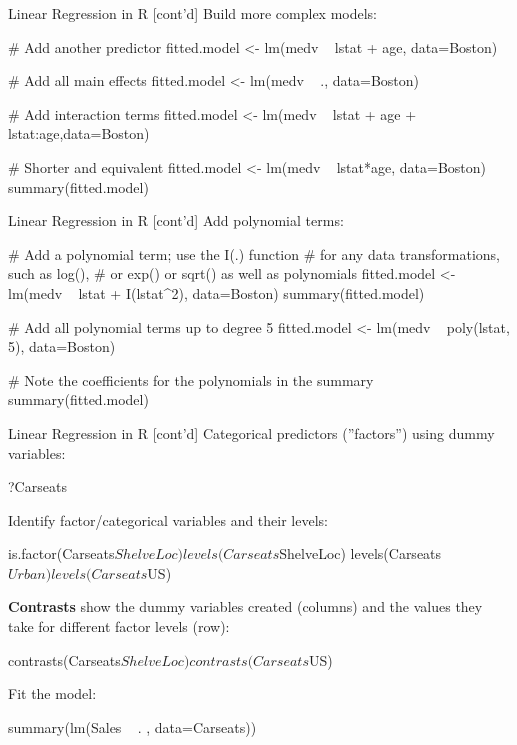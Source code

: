 \documentclass[ignorenonframetext,xcolor=x11names]{beamer}
\begin{document}
\begin{frame}[fragile]{Linear Regression in R \small [cont'd]}
Build more complex models:
\begin{Rcode}
# Add another predictor
fitted.model <- lm(medv ~ lstat + age, data=Boston)

# Add all main effects
fitted.model <- lm(medv ~ ., data=Boston)

# Add interaction terms
fitted.model <- lm(medv ~ lstat + age + lstat:age,data=Boston)
   
# Shorter and equivalent
fitted.model <- lm(medv ~ lstat*age, data=Boston)
summary(fitted.model)
\end{Rcode}
\end{frame}

\begin{frame}[fragile]{Linear Regression in R \small [cont'd]}
Add polynomial terms:
\begin{Rcode}
# Add a polynomial term; use the I(.) function
# for any data transformations, such as log(),
# or exp() or sqrt() as well as polynomials
fitted.model <- lm(medv ~ lstat + I(lstat^2), data=Boston)
summary(fitted.model)

# Add all polynomial terms up to degree 5
fitted.model <- lm(medv ~ poly(lstat, 5), data=Boston)

# Note the coefficients for the polynomials in the summary
summary(fitted.model)
\end{Rcode}
\end{frame}

\begin{frame}[fragile]{Linear Regression in R \small [cont'd]}
Categorical predictors (''factors'') using dummy variables:
\begin{Rcode}
?Carseats
\end{Rcode}
Identify factor/categorical variables and their levels:
\begin{Rcode}
is.factor(Carseats$ShelveLoc)
levels(Carseats$ShelveLoc)
levels(Carseats$Urban)
levels(Carseats$US)
\end{Rcode}
\textbf{Contrasts} show the dummy variables created (columns) and the values they take for different  factor levels (row):
\begin{Rcode}
contrasts(Carseats$ShelveLoc)
contrasts(Carseats$US)
\end{Rcode}
Fit the model:
\begin{Rcode}
summary(lm(Sales ~ . , data=Carseats))
\end{Rcode}
\end{frame}
\end{document}
